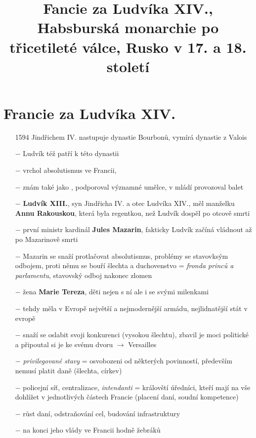 \documentclass{article}
\title{\vspace{-2cm}Fancie za Ludvíka XIV., Habsburská monarchie po třicetileté válce, Rusko v 17. a 18. století\vspace{-1.7cm}}
\date{}
\author{}
\begin{document}
\maketitle

\section*{Francie za Ludvíka XIV.}

\begin{itemize}
    \vspace{-0.5em}
    \setlength\itemsep{0.15em}
    \item[1594] Jindřichem IV. nastupuje dynastie Bourbonů, vymírá dynastie z Valois
    \item[$-$] Ludvík též patří k této dynastii
    \item[$-$] vrchol absolutismus ve Francii, 
    \item[$-$] znám také jako , podporoval významné umělce, v mládí provozoval balet
    \item[$-$] \textbf{Ludvík XIII.}, syn Jindřicha IV. a otec Ludvíka XIV., měl manželku \textbf{Annu Rakouskou}, která byla regentkou, než Ludvík dospěl po otcově smrti
    \item[$-$] první ministr kardinál \textbf{Jules Mazarin}, fakticky Ludvík začíná vládnout až po Mazarinově smrti
    \item[$-$] Mazarin se snaží protlačovat absolutismus, problémy se stavovksým odbojem, proti němu se bouří šlechta a duchovenstvo = \textit{fronda princů a parlamentu}, stavovský odboj nakonec zlomen
    \item[$-$] žena \textbf{Marie Tereza}, děti nejen s ní ale i se svými milenkami
    \item[$-$] tehdy měla v Evropě největší a nejmodernější armádu, nejlidnatější stát v evropě
    \item[$-$] snaží se oslabit svoji konkurenci (vysokou šlechtu), zbavil je moci politické a připoutal si je ke svému dvoru $\rightarrow$ Versailles
    \item[$-$] \textit{privilegované stavy} = osvobozeni od některých povinností, především nemusí platit daně (šlechta, církev)
    \item[$-$] policejní síť, centralizace, \textit{intendanti} = královští úředníci, kteří mají na vše dohlížet v jednotlivých částech Francie (placení daní, soudní kompetence)
    \item[$-$] růst daní, odstraňování cel, budování infrastruktury
    \item[$-$] na konci jeho vlády ve Francii hodně žebráků
\end{itemize}
\end{document}
